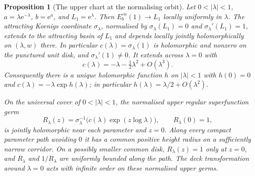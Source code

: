 \documentclass[11pt]{amsart}
\newtheorem{proposition}[theorem]{Proposition}
\theoremstyle{definition}
\newcommand{\eee}{\mathrm{e}}
\begin{document}
\begin{proposition}[The upper chart at the normalising orbit]
\label{prop:upper-orbit}
Let $0<|\lambda|<1$, $a=\lambda\eee^{-\lambda}$,
$b=\eee^a$, and $L_1=\eee^\lambda$.  Then
$E_b^{\circ n}(1)\to L_1$ locally uniformly in $\lambda$.
The attracting Koenigs coordinate $\sigma_\lambda$, normalised by
$\sigma_\lambda(L_1)=0$ and $\sigma_\lambda'(L_1)=1$, extends to the
attracting basin of $L_1$ and depends locally jointly holomorphically
on $(\lambda,w)$ there.  In particular
$c(\lambda)=\sigma_\lambda(1)$ is holomorphic and nonzero on the
punctured unit disk, and $\sigma_\lambda'(1)\ne0$.  It extends across
$\lambda=0$ with
\[
 c(\lambda)=-\lambda-\tfrac12\lambda^2+O(\lambda^3).
\]
Consequently there is a unique holomorphic function $h$ on $|\lambda|<1$
with $h(0)=0$ and $c(\lambda)=-\lambda\exp h(\lambda)$; in particular
$h(\lambda)=\lambda/2+O(\lambda^2)$.

On the universal cover of $0<|\lambda|<1$, the normalised upper regular
superfunction germ
\[
 R_\lambda(z)=\sigma_\lambda^{-1}
       \bigl(c(\lambda)\exp(z\log\lambda)\bigr),
 \qquad R_\lambda(0)=1,
\]
is jointly holomorphic near each parameter and $z=0$.  Along every
compact parameter path avoiding $0$ it has a common positive
height radius on a sufficiently narrow corridor.  On a possibly
smaller common disk, $R_\lambda(z)=1$ only at $z=0$, and
$R_\lambda$ and $1/R_\lambda$ are uniformly bounded along the path.
The deck transformation around $\lambda=0$ acts with infinite order on
these normalised upper germs.
\end{proposition}
\end{document}
